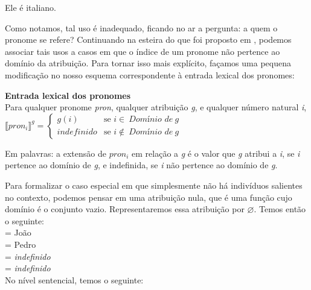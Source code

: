 \begin{exe}
\ex Ele é italiano.\label{cla}
\end{exe}

Como notamos, tal uso é inadequado, ficando no ar a pergunta: a
quem o pronome se refere? Continuando na esteira do que foi proposto em \cite{heikra98}, podemos associar
tais usos a casos em que o índice de um pronome não pertence ao
domínio da atribuição. Para tornar isso mais explícito, façamos
uma pequena modificação no nosso esquema
correspondente à entrada lexical dos pronomes:\\

\begin{tcolorbox}[boxrule=0pt,sharp corners]
	
	\textbf{Entrada lexical dos pronomes}\\
	Para qualquer pronome \textit{pron}, qualquer atribuição
	\textit{g}, e qualquer número natural \textit{i},\\
	
	$\llbracket pron_{i}\rrbracket^{g} =
	\begin{cases}
	g(i) & \text{se } i\in\ \textit{Domínio de}\ g\\
	indefinido & \text{se } i\not\in\ \textit{Domínio de}\ g
	\end{cases}$
	
\end{tcolorbox}

\bigskip

\n Em palavras: a extensão de $pron_{i}$ em relação a \textit{g} é
o valor que \textit{g} atribui a \textit{i}, se \textit{i}
pertence ao domínio de \textit{g}, e indefinida, se \textit{i} não
pertence ao domínio de \textit{g}.

Para formalizar o caso especial em que simplesmente não há
indivíduos salientes no contexto, podemos pensar em uma
atribuição nula, que é uma função cujo domínio é o conjunto
vazio. Representaremos
essa atribuição por $\varnothing$. Temos então o seguinte:\\

\n {} = João\\
 = Pedro\\
 = \textit{indefinido}\\
\gvaz = \textit{indefinido}\\

\n No nível sentencial, temos o seguinte:\\

